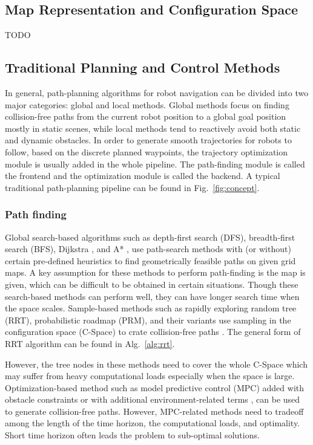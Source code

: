 \documentclass[letterpaper,journal,twoside]{IEEEtran}
\begin{document}
\subsection{Map Representation and Configuration Space}
TODO


\subsection{Traditional Planning and Control Methods}



In general, path-planning algorithms for robot navigation can be divided into two major categories: global and local methods.  
Global methods focus on finding collision-free paths from the current robot position to a global goal position mostly in static scenes, while local methods tend to reactively avoid both static and dynamic obstacles. 
In order to generate smooth trajectories for robots to follow, based on the discrete planned waypoints, the trajectory optimization module is usually added in the whole pipeline. 
The path-finding module is called the frontend and the optimization module is called the backend. 
A typical traditional path-planning pipeline can be found in Fig.~\ref{fig:concept}.

\subsubsection{Path finding}


% 
Global search-based algorithms such as depth-first search (DFS), breadth-first search (BFS), Dijkstra \cite{wang2011application}, and A* \cite{hart1968formal}, use path-search methods with (or without) certain pre-defined heuristics to find geometrically feasible paths on given grid maps. 
A key assumption for these methods to perform path-finding is the map is given, which can be difficult to be obtained in certain situations. 
Though these search-based methods can perform well, they can have longer search time when the space scales.
Sample-based methods such as rapidly exploring random tree (RRT), probabilistic roadmap (PRM), and their variants use sampling in the configuration space (C-Space) to crate collision-free paths \cite{lavalle2001rapidly,karaman2011sampling,kavraki1996probabilistic}. 
The general form of RRT algorithm can be found in Alg.~\ref{alg:rrt}.

However, the tree nodes in these methods need to cover the whole C-Space which may suffer from heavy computational loads especially when the space is large.  
Optimization-based method such as model predictive control (MPC) added with obstacle constraints or with additional environment-related terms \cite{park2009obstacle}, \cite{ji2016path}  can be used to generate collision-free paths. 
However, MPC-related methods need to tradeoff among the length of the time horizon, the computational loads, and optimality. Short time horizon often leads the problem to sub-optimal solutions.
\end{document}
